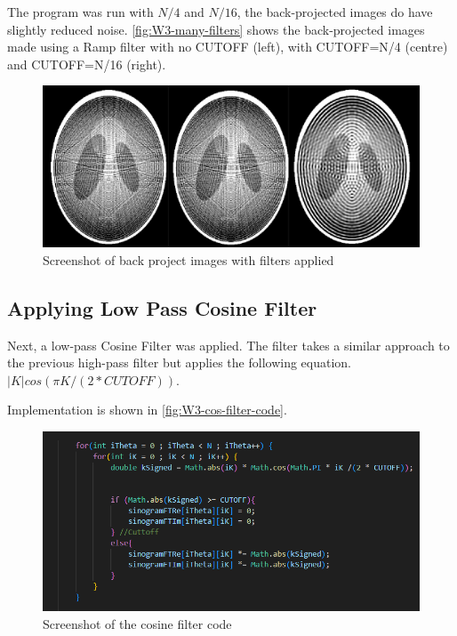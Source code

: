 The program was run with $N/4$ and $N/16$, the back-projected images do have slightly reduced noise. \autoref{fig:W3-many-filters} shows the back-projected images made using a Ramp filter with no CUTOFF (left), with CUTOFF=N/4 (centre) and CUTOFF=N/16 (right).  



\begin{figure}[H] 
    \centering
    \includegraphics[width=1\columnwidth]{Figures/Week 3/filtered-images-ramp-N-4-N-16.png}
    \caption{Screenshot of back project images with filters applied}
    \label{fig:W3-many-filters}
\end{figure}


\newpage
\subsection{Applying Low Pass Cosine Filter}

Next, a low-pass Cosine Filter was applied. The filter takes a similar approach to the previous high-pass filter but applies the following equation. \(|K|  cos(\pi K /(2  *  CUTOFF))\).

Implementation is shown in \autoref{fig:W3-cos-filter-code}. 

\begin{figure}[H] 
    \centering
    \includegraphics[width=1\columnwidth]{Figures/Week 3/filter-cos-codfe.png}
    \caption{Screenshot of the cosine filter code}
    \label{fig:W3-cos-filter-code}
\end{figure}

